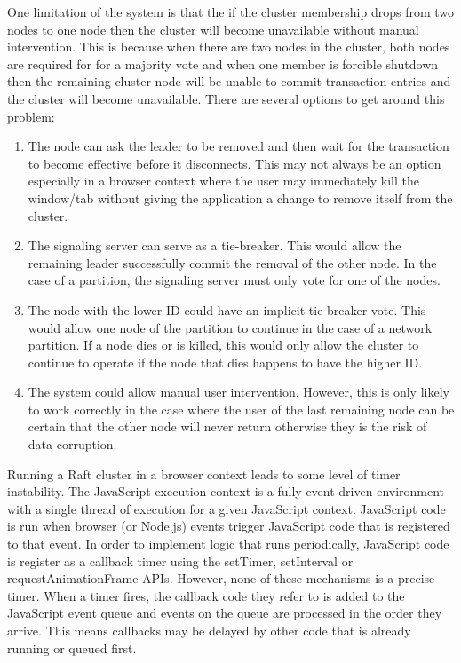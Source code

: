 \documentclass{acmtog} %
\begin{document}
One limitation of the system is that the if the cluster membership
drops from two nodes to one node then the cluster will become
unavailable without manual intervention. This is because when there
are two nodes in the cluster, both nodes are required for for
a majority vote and when one member is forcible shutdown then the
remaining cluster node will be unable to commit transaction entries
and the cluster will become unavailable. There are several options to
get around this problem:

\begin{enumerate}
\item The node can ask the leader to be removed and then wait for the
  transaction to become effective before it disconnects.  This may not
  always be an option especially in a browser context where the user
  may immediately kill the window/tab without giving the application
  a change to remove itself from the cluster.
\item The signaling server can serve as a tie-breaker. This would allow
  the remaining leader successfully commit the removal of the other
  node. In the case of a partition, the signaling server must only
  vote for one of the nodes.
\item The node with the lower ID could have an implicit tie-breaker vote.
  This would allow one node of the partition to continue in the case
  of a network partition. If a node dies or is killed, this would only
  allow the cluster to continue to operate if the node that dies
  happens to have the higher ID.
\item The system could allow manual user intervention. However, this is
  only likely to work correctly in the case where the user of the last
  remaining node can be certain that the other node will never return
  otherwise they is the risk of data-corruption.
\end{enumerate}

Running a Raft cluster in a browser context leads to some level of
timer instability. The JavaScript execution context is a fully event
driven environment with a single thread of execution for a given
JavaScript context. JavaScript code is run when browser (or Node.js)
events trigger JavaScript code that is registered to that event. In
order to implement logic that runs periodically, JavaScript code
is register as a callback timer using the setTimer, setInterval or
requestAnimationFrame APIs. However, none of these mechanisms is
a precise timer. When a timer fires, the callback code they refer to
is added to the JavaScript event queue and events on the queue are
processed in the order they arrive. This means callbacks may be
delayed by other code that is already running or queued first.
\end{document}
